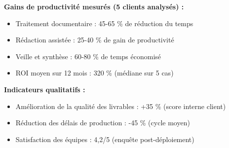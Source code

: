 \textbf{Gains de productivité mesurés (5 clients analysés) :}
\begin{itemize}
    \item Traitement documentaire : 45-65 \% de réduction du temps
    \item Rédaction assistée : 25-40 \% de gain de productivité
    \item Veille et synthèse : 60-80 \% de temps économisé
    \item ROI moyen sur 12 mois : 320 \% (médiane sur 5 cas)
\end{itemize}

\textbf{Indicateurs qualitatifs :}
\begin{itemize}
    \item Amélioration de la qualité des livrables : +35 \% (score interne client)
    \item Réduction des délais de production : -45 \% (cycle moyen)
    \item Satisfaction des équipes : 4,2/5 (enquête post-déploiement)
\end{itemize}
